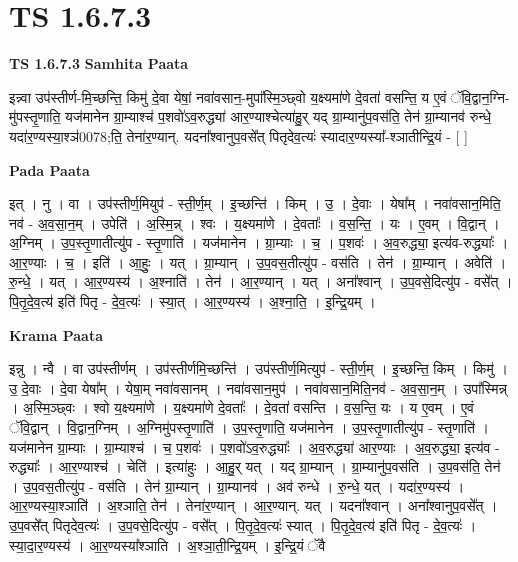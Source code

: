 \documentclass[17pt]{extarticle}
\begin{document}
\section*{ TS 1.6.7.3 }

\textbf{TS 1.6.7.3 } \newline
\textbf{Samhita Paata} \newline

इन्न्वा उप॑स्तीर्ण-मि॒च्छन्ति॒ किमु॑ दे॒वा येषां॒ नवा॑वसान॒-मुपा᳚स्मि॒ञ्छ्वो य॒क्ष्यमा॑णे दे॒वता॑ वसन्ति॒ य ए॒वं ॅवि॒द्वान॒ग्नि-मु॑पस्तृ॒णाति॒ यज॑मानेन ग्रा॒म्याश्च॑ प॒शवो॑ऽव॒रुद्ध्या॑ आर॒ण्याश्चेत्या॑हु॒र् यद् ग्रा॒म्यानु॑प॒वस॑ति॒ तेन॑ ग्रा॒म्यानव॑ रुन्धे॒ यदा॑र॒ण्यस्या॒श्ञ॑0078;ति॒ तेना॑र॒ण्यान्. यदना᳚श्वानुप॒वसे᳚त् पितृदेव॒त्यः॑ स्यादार॒ण्यस्या᳚-श्ञातीन्द्रि॒यं - [ ] \newline

\textbf{Pada Paata} \newline

इत् । नु । वा । उप॑स्तीर्ण॒मियुप॑ - स्ती॒र्ण॒म् । इ॒च्छन्ति॑ । किम् । उ॒ । दे॒वाः । येषा᳚म् । नवा॑वसान॒मिति॒ नव॑ - अ॒व॒सा॒न॒म् । उपेति॑ । अ॒स्मि॒न्न् । श्वः । य॒क्ष्यमा॑णे । दे॒वताः᳚ । व॒स॒न्ति॒ । यः । ए॒वम् । वि॒द्वान् । अ॒ग्निम् । उ॒प॒स्तृ॒णातीत्यु॑प - स्तृ॒णाति॑ । यज॑मानेन । ग्रा॒म्याः । च॒ । प॒शवः॑ । अ॒व॒रुद्ध्या॒ इत्य॑व-रुद्ध्याः᳚ । आ॒र॒ण्याः । च॒ । इति॑ । आ॒हुः॒ । यत् । ग्रा॒म्यान् । उ॒प॒वस॒तीत्यु॑प - वस॑ति । तेन॑ । ग्रा॒म्यान् । अवेति॑ । रु॒न्धे॒ । यत् । आ॒र॒ण्यस्य॑ । अ॒श्नाति॑ । तेन॑ । आ॒र॒ण्यान् । यत् । अना᳚श्वान् । उ॒प॒वसे॒दित्यु॑प - वसे᳚त् । पि॒तृ॒दे॒व॒त्य॑ इति॑ पितृ - दे॒व॒त्यः॑ । स्या॒त् । आ॒र॒ण्यस्य॑ । अ॒श्ना॒ति॒ । इ॒न्द्रि॒यम् ।  \newline


\textbf{Krama Paata} \newline

इन्नु । न्वै । वा उप॑स्तीर्णम् । उप॑स्तीर्णमि॒च्छन्ति॑ । उप॑स्तीर्ण॒मित्युप॑ - स्ती॒र्ण॒म् । इ॒च्छन्ति॒ किम् । किमु॑ । उ॒ दे॒वाः । दे॒वा येषा᳚म् । येषा॒म् नवा॑वसानम् । नवा॑वसान॒मुप॑ । नवा॑वसान॒मिति॒नव॑ - अ॒व॒सा॒न॒म् । उपा᳚स्मिन्न् । अ॒स्मि॒ञ्छ्वः । श्वो य॒क्ष्यमा॑णे । य॒क्ष्यमा॑णे दे॒वताः᳚ । दे॒वता॑ वसन्ति । व॒स॒न्ति॒ यः । य ए॒वम् । ए॒वं ॅवि॒द्वान् । वि॒द्वान॒ग्निम् । अ॒ग्निमु॑पस्तृ॒णाति॑ । उ॒प॒स्तृ॒णाति॒ यज॑मानेन । उ॒प॒स्तृ॒णातीत्यु॑प - स्तृ॒णाति॑ । यज॑मानेन ग्रा॒म्याः । ग्रा॒म्याश्च॑ । च॒ प॒शवः॑ । प॒शवो॑ऽव॒रुद्ध्याः᳚ । अ॒व॒रुद्ध्या॑ आर॒ण्याः । अ॒व॒रुद्ध्या॒ इत्य॑व - रुद्ध्याः᳚ । आ॒र॒ण्याश्च॑ । चेति॑ । इत्या॑हुः । आ॒हु॒र् यत् । यद् ग्रा॒म्यान् । ग्रा॒म्यानु॑प॒वस॑ति । उ॒प॒वस॑ति॒ तेन॑ । उ॒प॒वस॒तीत्यु॑प - वस॑ति । तेन॑ ग्रा॒म्यान् । ग्रा॒म्यानव॑ । अव॑ रुन्धे । रु॒न्धे॒ यत् । यदा॑र॒ण्यस्य॑ । आ॒र॒ण्यस्या॒श्ञाति॑ । अ॒श्ञाति॒ तेन॑ । तेना॑र॒ण्यान् । आ॒र॒ण्यान्. यत् । यदना᳚श्वान् । अना᳚श्वानुप॒वसे᳚त् । उ॒प॒वसे᳚त् पितृदेव॒त्यः॑ । उ॒प॒वसे॒दित्यु॑प - वसे᳚त् । पि॒तृ॒दे॒व॒त्यः॑ स्यात् । पि॒तृ॒दे॒व॒त्य॑ इति॑ पितृ - दे॒व॒त्यः॑ । स्या॒दा॒र॒ण्यस्य॑ । आ॒र॒ण्यस्या᳚श्ञाति । अ॒श्ञा॒ती॒न्द्रि॒यम् । इ॒न्द्रि॒यं ॅवै \newline
\end{document}
